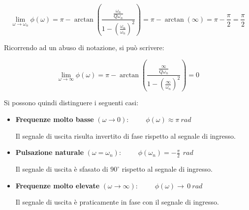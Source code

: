 \begin{equation}
\lim_{\omega \to \omega_n} \phi(\omega) = \pi
-\arctan\left(\frac{\frac{\omega_n}{Q\omega_n}}{1-\left(\frac{\omega_n}{\omega_n}\right)^2}\right)
=
\pi-\arctan(\infty)
=
\pi-\frac{\pi}{2}=\frac{\pi}{2}
\end{equation}

Ricorrendo ad un abuso di notazione, si può scrivere:

\begin{equation}
\lim_{\omega \to \infty} \phi(\omega) = \pi
-\arctan\left(\frac{\frac{\infty}{Q\omega_n}}{1-\left(\frac{\infty}{\omega_n}\right)^2}\right)
=
0
\end{equation}

Si possono quindi distinguere i seguenti casi:

\begin{itemize}

\item \textbf{Frequenze molto basse} $(\omega \to 0):\qquad$
\(
\phi(\omega) \approx \pi\SI{}{rad}
\)

Il segnale di uscita risulta invertito di fase rispetto al segnale di ingresso.

\item \textbf{Pulsazione naturale} $(\omega = \omega_n):\qquad$
\(
\phi(\omega_n) = -\frac{\pi}{2}\,\SI{}{rad}
\)

Il segnale di uscita è sfasato di $90^\circ$ rispetto al segnale di ingresso.

\item \textbf{Frequenze molto elevate} $(\omega \to \infty):\qquad$
\(
\phi(\omega) \to \,\SI{0}{rad}
\)

Il segnale di uscita è praticamente in fase con il segnale di ingresso.


\end{itemize}

